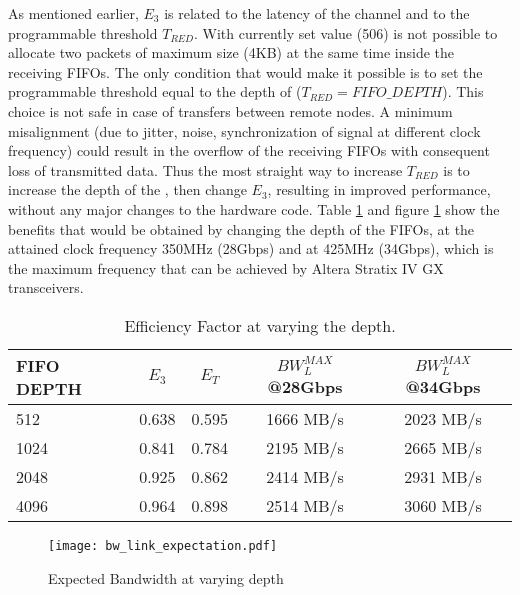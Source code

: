 As mentioned earlier, $E_{3}$ is related to the latency of the channel
and to the programmable threshold $T_{RED}$. With currently set value
(506) is not possible to allocate two packets of maximum size (4KB) at
the same time inside the receiving FIFOs. The only condition that
would make it possible is to set the programmable threshold equal to
the depth of  ($T_{RED}={FIFO\_DEPTH}$). This choice
is not safe in case of transfers between remote nodes. A minimum
misalignment (due to jitter, noise, synchronization of signal at
different clock frequency) could result in the overflow of the
receiving FIFOs with consequent loss of transmitted data.
Thus the most straight way to increase $T_{RED}$ is to increase the
depth of the , then change $E_{3}$, resulting in
improved performance, without any major changes to the hardware code.
Table \ref{tab:efficiency} and figure \ref{fig:link_expectation} show
the benefits that would be obtained by changing the depth of the
FIFOs, at the attained clock frequency 350MHz (28Gbps) and at 425MHz
(34Gbps), which is the maximum frequency that can be achieved by
Altera Stratix IV GX transceivers.

\begin{table}[!hbt]
\centering
\setlength\extrarowheight{2pt}
\begin{tabular}{|l|cccc|}
\hline
\hline
FIFO DEPTH & $E_{3}$ & $E_{T}$ & $BW_{L}^{MAX}$@28Gbps & $BW_{L}^{MAX}$@34Gbps  \\
\hline
512        & 0.638   & 0.595   & 1666 MB/s  & 2023 MB/s     \\
1024       & 0.841   & 0.784   & 2195 MB/s  & 2665 MB/s     \\
2048       & 0.925   & 0.862   & 2414 MB/s  & 2931 MB/s     \\
4096       & 0.964   & 0.898   & 2514 MB/s  & 3060 MB/s     \\
\hline
\hline
\end{tabular}
\caption{Efficiency Factor at varying the  depth.}
\label{tab:efficiency}
\end{table} 


\begin{figure}[!hbt]
  \centering
  \texttt{[image: bw\_link\_expectation.pdf]}
  \caption{Expected Bandwidth at varying  depth}
  \label{fig:link_expectation}
\end{figure}


